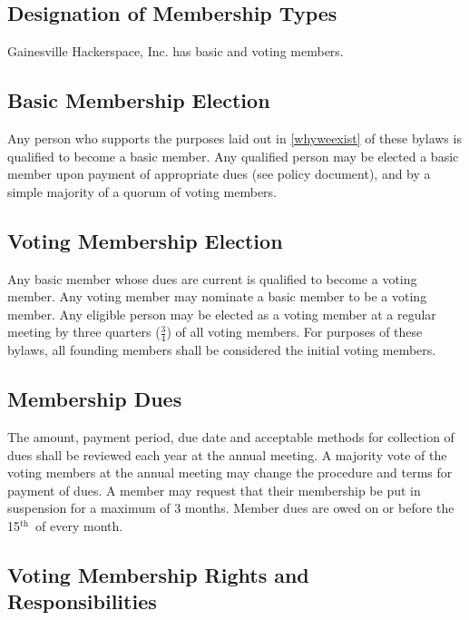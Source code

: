 \documentclass[10pt,letterpaper,titlepage]{article}
\newcommand\corpname{Gainesville Hackerspace, Inc.}
\newcommand{\superscript}[1]{\ensuremath{^{\textrm{#1}}}}
\renewcommand{\th}[0]{\superscript{th}}
\begin{document}
\subsection{Designation of Membership Types}

\corpname{} has basic and voting members.

\subsection{Basic Membership Election}

Any person who supports the purposes laid out in \ref{whyweexist} of
these bylaws is qualified to become a basic member.  Any qualified person
may be elected a basic member upon payment of appropriate dues
(see policy document), and by a simple majority of a quorum of voting
members.


\subsection{Voting Membership Election}

Any basic member whose dues are current is qualified to become a voting
member.  Any voting member may nominate a basic member to be a voting
member.  Any eligible person may be elected as a voting member at a
regular meeting by three quarters ($\frac{3}{4}$) of all voting members.  
For purposes of these bylaws, all founding members shall be considered 
the initial voting members.


\subsection{Membership Dues}
\label{votmemdue}

The amount, payment period, due date and acceptable methods for collection of
dues shall be reviewed each year at the annual meeting.
A majority vote of the voting members at the annual meeting may change the procedure
and terms for payment of dues.
A member may request that their membership be put in suspension for a maximum
of 3 months.
Member dues are owed on or before the 15\th\ of every month.


\subsection{Voting Membership Rights and Responsibilities}
\end{document}
